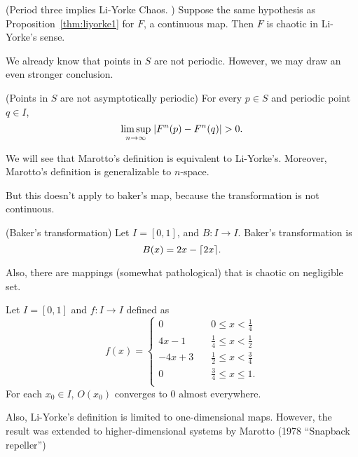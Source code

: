 \documentclass[11pt]{article}
\begin{document}
\begin{proposition}
  (Period three implies Li-Yorke Chaos. \cite{li-yorke})
  Suppose the same hypothesis as Proposition~\ref{thm:liyorke1} for $F$,
  a continuous map.
  Then $F$ is chaotic in Li-Yorke's sense.
\end{proposition}

We already know that points in $S$ are not periodic.
However, we may draw an even stronger conclusion.
\begin{proposition}
  (Points in $S$ are not asymptotically periodic)
  For every $p \in S$ and periodic point $q \in I$,
  \begin{equation*}
    \limsup\limits_{n \to \infty}\; \lvert F^n(p) - F^n(q)\rvert > 0.
  \end{equation*}
\end{proposition}

  We will see that Marotto's definition is equivalent to Li-Yorke's.
Moreover, Marotto's definition is generalizable to $n$-space.

But this doesn't apply to baker's map, because the transformation is not continuous.
\begin{definition}
  (Baker's transformation)
  Let $I = [0,1]$, and $B: I \to I$. Baker's transformation is
  \begin{equation*}
    B(x) = 2x - \lceil2x\rceil.
  \end{equation*}
\end{definition}

Also, there are mappings  (somewhat pathological) that is chaotic on negligible set.
\begin{proposition}
  Let $I = [0,1]$ and $f: I \to I$ defined as
  \begin{equation*}
    f(x) =
    \begin{cases}
      0 \quad & 0\leq x < \frac{1}{4} \\
      4x - 1 \quad  & \frac{1}{4} \leq x < \frac{1}{2} \\
      -4x + 3 \quad & \frac{1}{2} \leq x < \frac{3}{4} \\
      0 \quad & \frac{3}{4} \leq x \leq 1. \\
    \end{cases}
  \end{equation*}
  For each $x_0 \in I$, $O(x_0)$ converges to 0 almost everywhere.
\end{proposition}

Also, Li-Yorke's definition is limited to one-dimensional maps.
However, the result was extended to higher-dimensional systems by Marotto (1978 ``Snapback repeller'')



\end{document}
